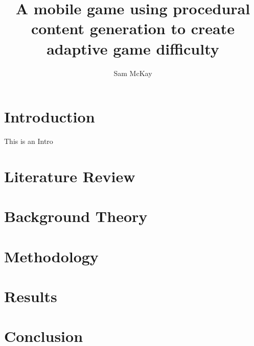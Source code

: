 \documentclass[]{report}
\title{A mobile game using procedural content generation to create adaptive game difficulty}
\author{Sam McKay}
\begin{document}
\maketitle
\newpage
\tableofcontents
\newpage

\begin{abstract}

\end{abstract}

\chapter{Introduction}
This is an Intro 
\chapter{Literature Review}

\chapter{Background Theory}

\chapter{Methodology}

\chapter{Results}

\chapter{Conclusion}




\appendix
\end{document}
